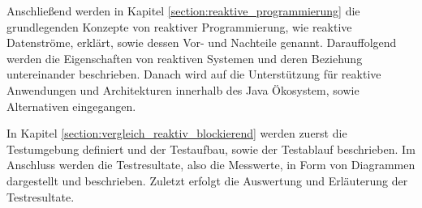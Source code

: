Anschließend werden in Kapitel \ref{section:reaktive_programmierung} die grundlegenden Konzepte von reaktiver Programmierung,
wie reaktive Datenströme, erklärt, sowie dessen Vor- und Nachteile genannt. Darauffolgend werden die Eigenschaften von reaktiven
Systemen und deren Beziehung untereinander beschrieben.
Danach wird auf die Unterstützung für reaktive Anwendungen und Architekturen innerhalb des Java Ökosystem, sowie Alternativen
eingegangen.

In Kapitel \ref{section:vergleich_reaktiv_blockierend} werden zuerst die Testumgebung definiert und der Testaufbau,
sowie der Testablauf beschrieben.
Im Anschluss werden die Testresultate, also die Messwerte, in Form von Diagrammen dargestellt und beschrieben.
Zuletzt erfolgt die Auswertung und Erläuterung der Testresultate.